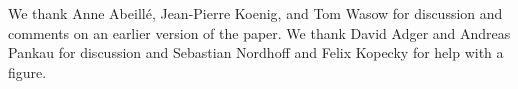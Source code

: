 \documentclass[output=paper
	        ,collection
	        ,collectionchapter
 	        ,biblatex
                ,babelshorthands
                ,newtxmath
                ,draftmode
                ,colorlinks, citecolor=brown
]{langscibook}
\begin{document}
We thank Anne Abeillé, Jean-Pierre Koenig, and Tom Wasow for discussion and comments on an earlier
version of the paper. We thank David Adger and Andreas Pankau for discussion and Sebastian Nordhoff
and Felix Kopecky for help with a figure.













\end{document}
